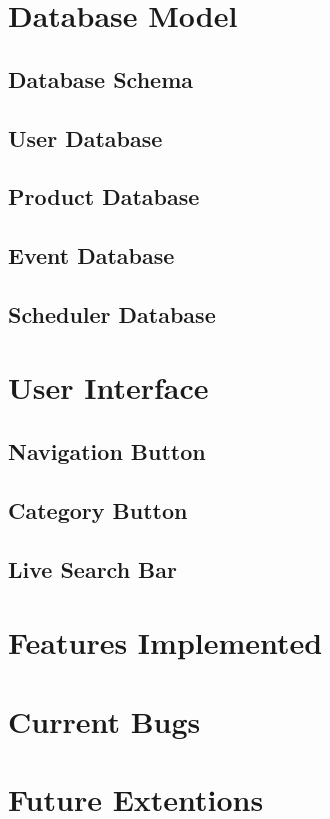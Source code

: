 \documentclass[a4paper,12pt]{article}
\begin{document}
\section{Database Model}
\subsection{Database Schema}
\subsection{User Database}
\subsection{Product Database}
\subsection{Event Database}
\subsection{Scheduler Database}

\section{User Interface}
\subsection{Navigation Button}
\subsection{Category Button}
\subsection{Live Search Bar}

\section{Features Implemented}

\section{Current Bugs}

\section{Future Extentions}
\end{document}
